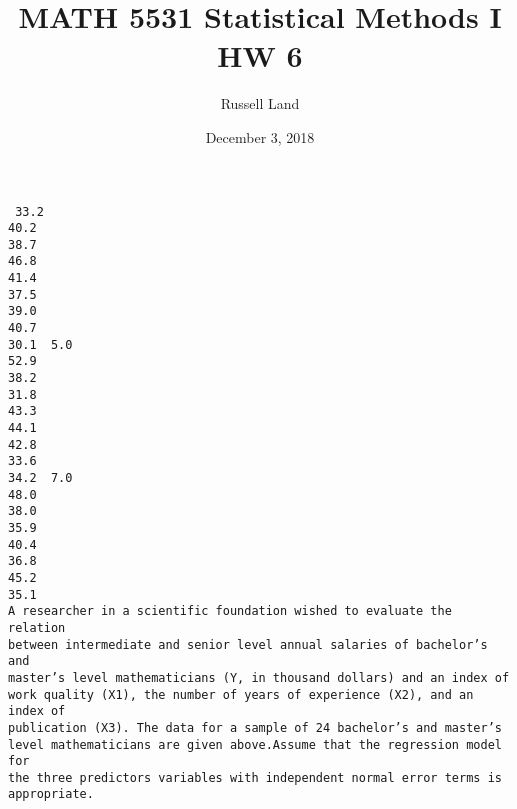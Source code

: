 \documentclass[oneside,10pt]{article}
\title{MATH 5531 Statistical Methods I HW 6}
\author{Russell Land}
\date{December 3, 2018}
\begin{document}
\maketitle
	\begin{mdframed}
	\texttt{
		\hspace{-4mm} 33.2  \  \\
		40.2   \\
		38.7   \\
		46.8   \\
		41.4   \\
		37.5   \\
		39.0   \\
		40.7   \\
		30.1  \quad \ 5.0 \quad 5.8\\
		52.9   \\
		38.2   \\
		31.8   \\
		43.3   \\
		44.1   \\
		42.8   \\
		33.6   \\
		34.2  \quad \ 7.0 \quad 5.5\\
		48.0   \\
		38.0   \\
		35.9   \\
		40.4   \\
		36.8   \\
		45.2   \\
		35.1   \\[2mm]
		A researcher in a scientific foundation wished to evaluate the relation\\ between intermediate and senior level annual salaries of bachelor's and\\ master's level mathematicians (Y, in thousand dollars) and an index of work quality (X1), the number of years of experience (X2), and an index of\\ publication (X3). The data for a sample of 24 bachelor's and master's\\ level mathematicians are given above.Assume that the regression model for\\ the three predictors variables with independent normal error terms is\\ appropriate.
}
\end{mdframed}
\end{document}
